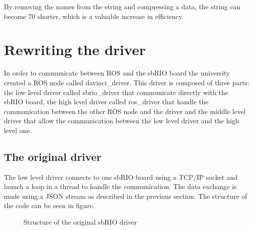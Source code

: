 By removing the names from the string and compressing a data, the string can become 70 shorter, which is a valuable increase in efficiency.



\section{Rewriting the driver}

In order to communicate between ROS and the sbRIO board the university created a ROS node called davinci\_driver. This driver is composed of three parts: the low level driver called sbrio\_driver that communicate directly with the sbRIO board, the high level driver called ros\_driver that handle the communication between the other ROS node and the driver and the middle level driver that allow the communication between the low level driver and the high level one.

\subsection{The original driver}
The low level driver connects to one sbRIO board using a TCP/IP socket and launch a loop in a thread to handle the communication. The data exchange is made using a JSON stream as described in the previous section. The structure of the code can be seen in figure.

\begin{figure}[H]
\centering
{}
\caption{Structure of the original sbRIO driver}
\label{original_driver}
\end{figure}


